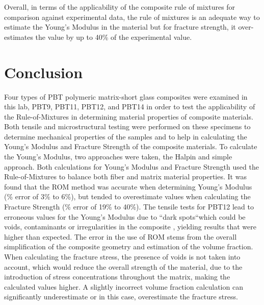 \documentclass[11pt]{article}
\begin{document}
Overall, in terms of the applicability of the composite rule of mixtures for comparison against experimental data, the rule of mixtures is an adequate way to estimate the Young's Modulus in the material but for fracture strength, it over-estimates the value by up to 40\% of the experimental value.

\section{Conclusion}

Four types of PBT polymeric matrix-short glass composites were examined in this lab, PBT9, PBT11, PBT12, and PBT14 in order to test the applicability of the Rule-of-Mixtures in determining material properties of composite materials. Both tensile and microstructural testing were performed on these specimens to determine mechanical properties of the samples and to help in calculating the Young's Modulus and Fracture Strength of the composite materials. To calculate the Young's Modulus, two approaches were taken, the Halpin and simple approach. Both calculations for Young's Modulus and Fracture Strength used the Rule-of-Mixtures to balance both fiber and matrix material properties. It was found that the ROM method was  accurate when determining Young's Modulus (\% error of 3\% to 6\%), but tended to overestimate values when calculating the Fracture Strength (\% error of 19\% to 40\%). The tensile tests for PBT12 lead to erroneous values for the Young's Modulus due to ``dark spots``which could be voids, contaminants or irregularities in the composite , yielding results that were higher than expected.
\singlespacing
The error in the use of ROM stems from the overall simplification of the composite geometry and estimation of the volume fraction. When calculating the fracture stress, the presence of voids is not taken into account, which would reduce the overall strength of the material, due to the introduction of stress concentrations throughout the matrix, making the calculated values higher. A slightly incorrect volume fraction calculation can significantly underestimate or in this case, overestimate the fracture stress.
\end{document}
